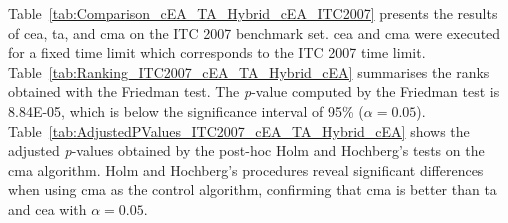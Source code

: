Table~\ref{tab:Comparison_cEA_TA_Hybrid_cEA_ITC2007} presents the results of \gls{cea}, \gls{ta}, and \gls{cma} on the ITC 2007 benchmark set. \gls{cea} and \gls{cma} were executed for a fixed time limit which corresponds to the ITC 2007 time limit. Table~\ref{tab:Ranking_ITC2007_cEA_TA_Hybrid_cEA} summarises the ranks obtained with the Friedman test. The \textit{p}-value computed by the Friedman test is \num{8.84E-05}, which is below the significance interval of 95\% ($\alpha = 0.05$). Table~\ref{tab:AdjustedPValues_ITC2007_cEA_TA_Hybrid_cEA} shows the adjusted \textit{p}-values obtained by the post-hoc Holm and Hochberg's tests on the \gls{cma} algorithm. Holm and Hochberg's procedures reveal significant differences when using \gls{cma} as the control algorithm, confirming that \gls{cma} is better than \gls{ta} and \gls{cea} with $\alpha = 0.05$. 




